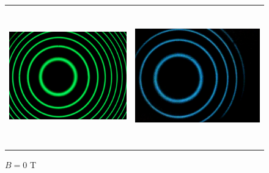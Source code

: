 \documentclass[a4paper,12pt,abstracton]{scrartcl}
\begin{document}
\begin{figure}[H]
\begin{tabular}{c c}
      \includegraphics[width=7.5cm,keepaspectratio]{images/za0.png} & \includegraphics[height=6cm,keepaspectratio]{images/zal0.png} \\
      \end{tabular}
    \caption{$B=0$ T }
    \label{fig:B0}
\end{figure}
\end{document}
